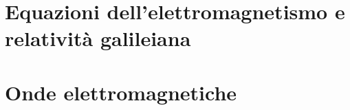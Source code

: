 \documentclass[letterpaper,10pt,italian]{jupyterBook}
\begin{document}
\sphinxstepscope




\chapter{Equazioni dell’elettromagnetismo e relatività galileiana}
\label{\detokenize{ch/low-speed-relativity:equazioni-dell-elettromagnetismo-e-relativita-galileiana}}\label{\detokenize{ch/low-speed-relativity:classical-electromagnetism-low-speed-relativity}}\label{\detokenize{ch/low-speed-relativity::doc}}
\sphinxstepscope




\chapter{Onde elettromagnetiche}
\label{\detokenize{ch/waves:onde-elettromagnetiche}}\label{\detokenize{ch/waves:classical-electromagnetism-waves}}\label{\detokenize{ch/waves::doc}}
\sphinxstepscope
\end{document}
